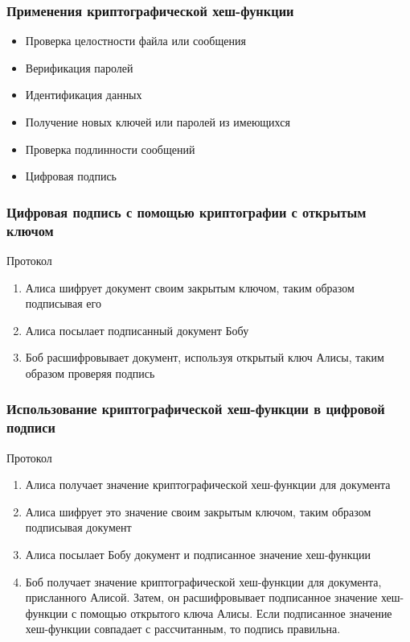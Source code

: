 \documentclass{beamer}
\begin{document}
\begin{frame}
  \frametitle{Применения криптографической хеш-функции}

  \begin{itemize}
    \item{Проверка целостности файла или сообщения}
    \item{Верификация паролей}
    \item{Идентификация данных}
    \item{Получение новых ключей или паролей из имеющихся}
    \item{Проверка подлинности сообщений}
    \item{Цифровая подпись}
  \end{itemize}
\end{frame}


\begin{frame}
  \frametitle{Цифровая подпись с помощью криптографии с открытым ключом}

  \begin{block} {Протокол}
    \begin{enumerate}
      \item{Алиса шифрует документ своим закрытым ключом, таким образом подписывая его}
      \item{Алиса посылает подписанный документ Бобу}
      \item{Боб расшифровывает документ, используя открытый ключ Алисы, таким образом проверяя подпись}
    \end{enumerate}
  \end{block}
\end{frame}


\begin{frame}
  \frametitle{Использование криптографической хеш-функции в цифровой подписи}

  \begin{block} {Протокол}
    \begin{enumerate}
      \item{Алиса получает значение криптографической хеш-функции для документа}
      \item{Алиса шифрует это значение своим закрытым ключом, таким образом подписывая документ}
      \item{Алиса посылает Бобу документ и подписанное значение хеш-функции}
      \item{Боб получает значение криптографической хеш-функции для документа, присланного Алисой. Затем,
            он расшифровывает подписанное значение хеш-функции с помощью открытого ключа Алисы. Если подписанное
            значение хеш-функции совпадает с рассчитанным, то подпись правильна.}
    \end{enumerate}
  \end{block}
\end{frame}
\end{document}
